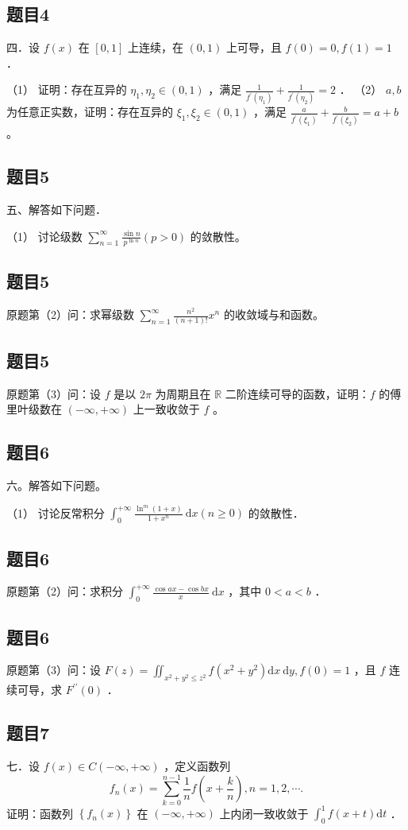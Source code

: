 \documentclass{article}
\begin{document}
\subsection{题目4}
四．设 \(f(x)\) 在 \([0,1]\) 上连续，在 \((0,1)\) 上可导，且 \(f(0)=0, f(1)=1\) ．

（1） 证明：存在互异的 \(\eta_{1}, \eta_{2} \in(0,1)\) ，满足 \(\frac{1}{f^{\prime}\left(\eta_{1}\right)}+\frac{1}{f^{\prime}\left(\eta_{2}\right)}=2\) ．
（2） \(a, b\) 为任意正实数，证明：存在互异的 \(\xi_{1}, \xi_{2} \in(0,1)\) ，满足 \(\frac{a}{f^{\prime}\left(\xi_{1}\right)}+\frac{b}{f^{\prime}\left(\xi_{2}\right)}=a+b\) 。

\subsection{题目5}
五、解答如下问题．

（1） 讨论级数 \(\sum_{n=1}^{\infty} \frac{\sin n}{p^{\ln n}}(p>0)\) 的敛散性。

\subsection{题目5}
原题第（2）问：求幂级数 \(\sum_{n=1}^{\infty} \frac{n^{2}}{(n+1)!} x^{n}\) 的收敛域与和函数。

\subsection{题目5}
原题第（3）问：设 \(f\) 是以 \(2 \pi\) 为周期且在 \(\mathbb{R}\) 二阶连续可导的函数，证明：\(f\) 的傅里叶级数在 \((-\infty,+\infty)\) 上一致收敛于 \(f\) 。

\subsection{题目6}
六。解答如下问题。

（1） 讨论反常积分 \(\int_{0}^{+\infty} \frac{\ln ^{m}(1+x)}{1+x^{n}} \mathrm{~d} x(n \geq 0)\) 的敛散性．

\subsection{题目6}
原题第（2）问：求积分 \(\int_{0}^{+\infty} \frac{\cos a x-\cos b x}{x} \mathrm{~d} x\) ，其中 \(0<a<b\) ．

\subsection{题目6}
原题第（3）问：设 \(F(z)=\iint_{x^{2}+y^{2} \leq z^{2}} f\left(x^{2}+y^{2}\right) \mathrm{d} x \mathrm{~d} y, f(0)=1\) ，且 \(f\) 连续可导，求 \(F^{\prime \prime}(0)\) ．

\subsection{题目7}
七．设 \(f(x) \in C(-\infty,+\infty)\) ，定义函数列
\[
f_{n}(x)=\sum_{k=0}^{n-1} \frac{1}{n} f\left(x+\frac{k}{n}\right), n=1,2, \cdots .
\]
证明：函数列 \(\left\{f_{n}(x)\right\}\) 在 \((-\infty,+\infty)\) 上内闭一致收敛于 \(\int_{0}^{1} f(x+t) \mathrm{d} t\) ．
\end{document}
